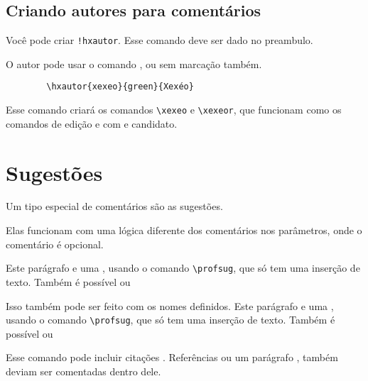 \documentclass{article}
\begin{document}
    \subsection{Criando autores para comentários}
    Você pode criar  \verb*|!hxautor|. Esse comando deve ser dado no preambulo.
    
    O autor pode usar o comando , ou sem marcação também.
    
    \begin{verbatim}
        \hxautor{xexeo}{green}{Xexéo}
    \end{verbatim}
    
    Esse comando criará os comandos \verb!\xexeo! e \verb!\xexeor!, que funcionam como os comandos de edição  e com  e candidato.
    
\section{Sugestões}

Um tipo especial de comentários são as sugestões.

Elas funcionam com uma lógica diferente dos comentários nos parâmetros, onde o comentário é opcional.

Este parágrafo  e 
uma , usando o comando \verb*|\profsug|, que só tem uma inserção de texto. Também é possível  ou 

Isso também pode ser feito com os nomes definidos. 
Este parágrafo  e 
uma , usando o comando \verb*|\profsug|, que só tem uma inserção de texto. Também é possível  ou 

Esse comando pode incluir citações . 
Referências %
ou um parágrafo 
\xexeorem{\ref{sug:com1}}, também deviam ser comentadas dentro dele.
\end{document}
